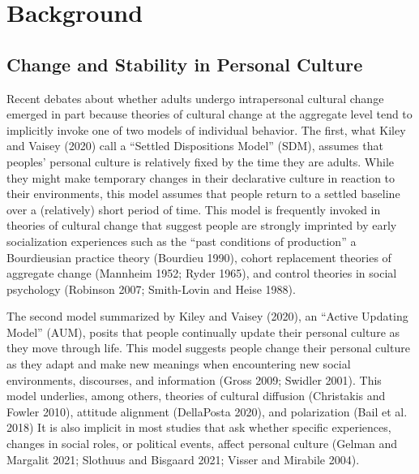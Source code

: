 \documentclass[
  11pt,
]{article}
\begin{document}
\hypertarget{background}{%
\section{Background}\label{background}}

\hypertarget{change-and-stability-in-personal-culture}{%
\subsection{Change and Stability in Personal
Culture}\label{change-and-stability-in-personal-culture}}

Recent debates about whether adults undergo intrapersonal cultural
change emerged in part because theories of cultural change at the
aggregate level tend to implicitly invoke one of two models of
individual behavior. The first, what Kiley and Vaisey (2020) call a
``Settled Dispositions Model'' (SDM), assumes that peoples' personal
culture is relatively fixed by the time they are adults. While they
might make temporary changes in their declarative culture in reaction to
their environments, this model assumes that people return to a settled
baseline over a (relatively) short period of time. This model is
frequently invoked in theories of cultural change that suggest people
are strongly imprinted by early socialization experiences such as the
``past conditions of production'' a Bourdieusian practice theory
(Bourdieu 1990), cohort replacement theories of aggregate change
(Mannheim 1952; Ryder 1965), and control theories in social psychology
(Robinson 2007; Smith-Lovin and Heise 1988).

The second model summarized by Kiley and Vaisey (2020), an ``Active
Updating Model'' (AUM), posits that people continually update their
personal culture as they move through life. This model suggests people
change their personal culture as they adapt and make new meanings when
encountering new social environments, discourses, and information (Gross
2009; Swidler 2001). This model underlies, among others, theories of
cultural diffusion (Christakis and Fowler 2010), attitude alignment
(DellaPosta 2020), and polarization (Bail et al. 2018) It is also
implicit in most studies that ask whether specific experiences, changes
in social roles, or political events, affect personal culture (Gelman
and Margalit 2021; Slothuus and Bisgaard 2021; Visser and Mirabile
2004).
\end{document}
